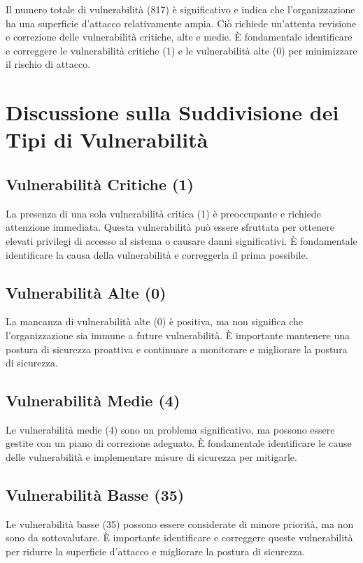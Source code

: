 Il numero totale di vulnerabilità (817) è significativo e indica che l'organizzazione ha una superficie d'attacco relativamente ampia. Ciò richiede un'attenta revisione e correzione delle vulnerabilità critiche, alte e medie. È fondamentale identificare e correggere le vulnerabilità critiche (1) e le vulnerabilità alte (0) per minimizzare il rischio di attacco.

\section{Discussione sulla Suddivisione dei Tipi di Vulnerabilità}

\subsection{Vulnerabilità Critiche (1)}

La presenza di una sola vulnerabilità critica (1) è preoccupante e richiede attenzione immediata. Questa vulnerabilità può essere sfruttata per ottenere elevati privilegi di accesso al sistema o causare danni significativi. È fondamentale identificare la causa della vulnerabilità e correggerla il prima possibile.

\subsection{Vulnerabilità Alte (0)}

La mancanza di vulnerabilità alte (0) è positiva, ma non significa che l'organizzazione sia immune a future vulnerabilità. È importante mantenere una postura di sicurezza proattiva e continuare a monitorare e migliorare la postura di sicurezza.

\subsection{Vulnerabilità Medie (4)}

Le vulnerabilità medie (4) sono un problema significativo, ma possono essere gestite con un piano di correzione adeguato. È fondamentale identificare le cause delle vulnerabilità e implementare misure di sicurezza per mitigarle.

\subsection{Vulnerabilità Basse (35)}

Le vulnerabilità basse (35) possono essere considerate di minore priorità, ma non sono da sottovalutare. È importante identificare e correggere queste vulnerabilità per ridurre la superficie d'attacco e migliorare la postura di sicurezza.

